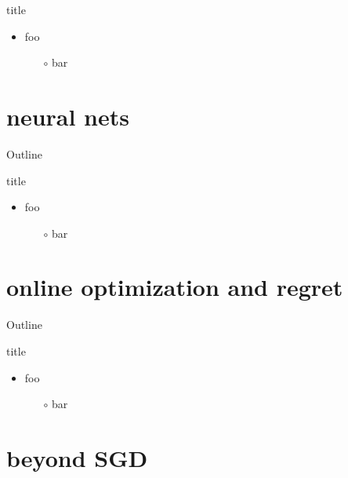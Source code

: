 \documentclass[10pt,
               svgnames,
               hyperref={colorlinks,citecolor=DeepPink4,linkcolor=FireBrick,urlcolor=Maroon},
               usepdftitle=false]{beamer}
\begin{document}
\begin{frame}{title}

\begin{itemize}
\item foo
   \begin{itemize}
   \item[$\circ$] bar
   \end{itemize}
\end{itemize}
\end{frame}


\section{neural nets}

\begin{frame}{Outline}
\end{frame}

\begin{frame}{title}

\begin{itemize}
\item foo
   \begin{itemize}
   \item[$\circ$] bar
   \end{itemize}
\end{itemize}
\end{frame}


\section{online optimization and regret}

\begin{frame}{Outline}
\end{frame}

\begin{frame}{title}

\begin{itemize}
\item foo
   \begin{itemize}
   \item[$\circ$] bar
   \end{itemize}
\end{itemize}
\end{frame}


\section{beyond SGD}
\end{document}
